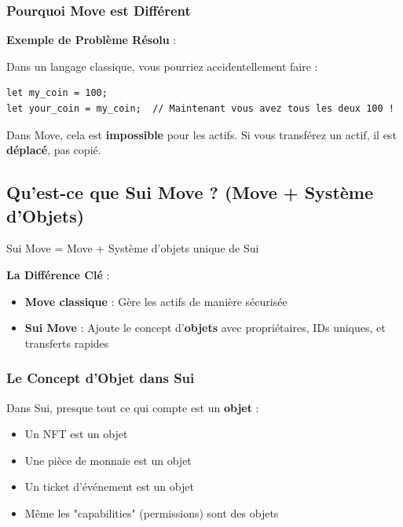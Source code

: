 \documentclass[11pt]{article}
\begin{document}
\subsubsection{Pourquoi Move est Différent}

\begin{exampleBox}
\textbf{Exemple de Problème Résolu} :

Dans un langage classique, vous pourriez accidentellement faire :
\begin{lstlisting}
let my_coin = 100;
let your_coin = my_coin;  // Maintenant vous avez tous les deux 100 !
\end{lstlisting}

Dans Move, cela est \textbf{impossible} pour les actifs. Si vous transférez un actif, il est \textbf{déplacé}, pas copié.
\end{exampleBox}

\subsection{Qu'est-ce que Sui Move ? (Move + Système d'Objets)}

Sui Move = Move + Système d'objets unique de Sui

\begin{explainBox}
\textbf{La Différence Clé} :
\begin{itemize}
  \item \textbf{Move classique} : Gère les actifs de manière sécurisée
  \item \textbf{Sui Move} : Ajoute le concept d'\textbf{objets} avec propriétaires, IDs uniques, et transferts rapides
\end{itemize}
\end{explainBox}

\subsubsection{Le Concept d'Objet dans Sui}

Dans Sui, presque tout ce qui compte est un \textbf{objet} :
\begin{itemize}
  \item Un NFT est un objet
  \item Une pièce de monnaie est un objet
  \item Un ticket d'événement est un objet
  \item Même les "capabilities" (permissions) sont des objets
\end{itemize}
\end{document}
